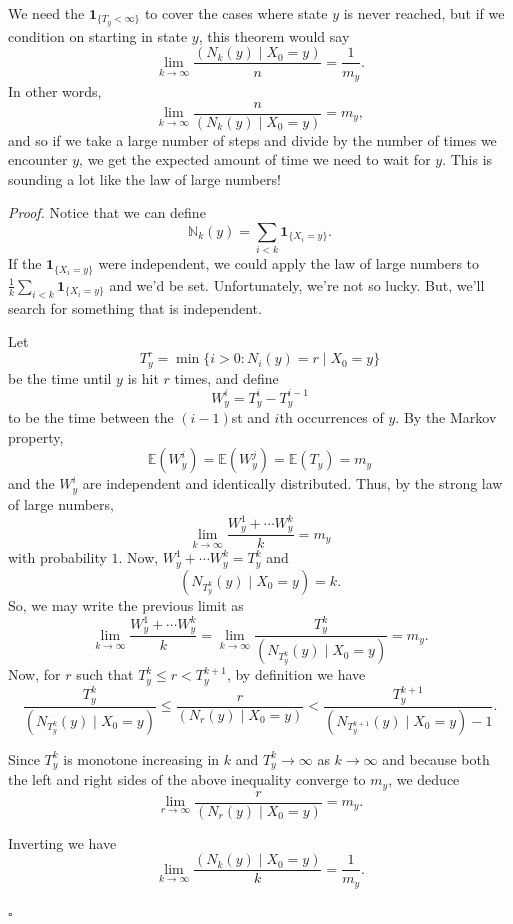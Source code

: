 \documentclass{problemset}
\newcommand{\N}{\mathbb{N}}
\newcommand{\E}{\mathbb{E}}
\newcommand{\1}{\mathbf{1}}
\newenvironment{proof}{\emph{Proof.}}{\hfill$\square$}
\begin{document}
	We need the $\1_{\{T_y<\infty\}}$ to cover the cases where state $y$ is never reached,
	but if we condition on starting in state $y$, this theorem would say
	\[
		\lim_{k\to\infty} \frac{(N_k(y)\mid X_0=y)}{n} = \frac{1}{m_y}.
	\]
	In other words, 
	\[
		\lim_{k\to\infty} \frac{n}{(N_k(y)\mid X_0=y)} = m_y,
	\]
	and so if we take a large number of steps and divide by the number of times we encounter $y$,
	we get the expected amount of time we need to wait for $y$.  This is sounding a
	lot like the law of large numbers!

	\begin{proof}
		Notice that we can define
		\[
			\N_k(y) = \sum_{i<k} \1_{\{X_i=y\}}.
		\]
		If the $\1_{\{X_i=y\}}$ were independent, we could apply the law of large numbers to
		$\frac{1}{k}\sum_{i<k} \1_{\{X_i=y\}}$ and we'd be set.  Unfortunately,
		we're not so lucky.  But, we'll search for something that is independent.

		Let
		\[
			T^r_y = \min\{i>0: N_i(y)=r\mid X_0=y\}
		\]
		be the time until $y$ is hit $r$ times, and define
		\[
			W^i_y = T^i_y-T^{i-1}_y
		\]
		to be the time between the $(i-1)$st and $i$th occurrences of $y$.
		By the Markov property, 
		\[
			\E(W_y^i) = \E(W_y^j) = \E(T_y) = m_y
		\]
		and the $W_y^i$ are independent and identically distributed.  Thus, by the strong
		law of large numbers,
		\[
			\lim_{k\to\infty} \frac{W_y^1+\cdots W_y^k}{k} = m_y
		\]
		with probability $1$.  Now, $W_y^1+\cdots W_y^k=T_y^k$ and
		\[
			(N_{T_y^k}(y)\mid X_0=y) = k.
		\]
		So, we may write the previous limit as
		\[
			\lim_{k\to\infty} \frac{W_y^1+\cdots W_y^k}{k} = 
			\lim_{k\to\infty} \frac{T_y^k}{(N_{T_y^k}(y)\mid X_0=y)} = 
			m_y.
		\]
		Now, for $r$ such that $T_y^k\leq r <T_y^{k+1}$, by definition we have
		\[
			\frac{T_y^k}{(N_{T_y^k}(y)\mid X_0=y)}
			\leq \frac{r}{(N_r(y)\mid X_0=y)}
			< \frac{T_y^{k+1}}{(N_{T_y^{k+1}}(y)\mid X_0=y)-1}.
		\]


		Since $T_y^k$ is monotone
		increasing in $k$ and $T_y^k\to\infty$ as $k\to\infty$ and because
		both the left and right sides of the above inequality converge to $m_y$, we deduce
		\[
			\lim_{r\to\infty} \frac{r}{(N_{r}(y)\mid X_0=y)} = 
			m_y.
		\]

		Inverting we have
		\[
			\lim_{k\to\infty} \frac{(N_{k}(y)\mid X_0=y)}{k} = 
			\frac{1}{m_y}.
		\]


\end{proof}
\end{document}
